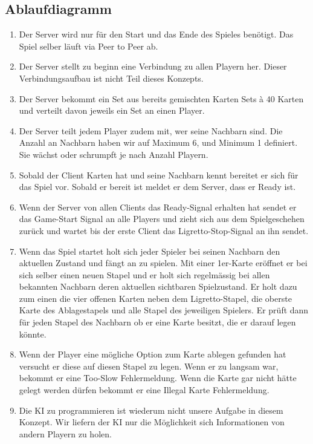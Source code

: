 \newpage

\subsection{Ablaufdiagramm}

\begin{enumerate}
	\item Der Server wird nur für den Start und das Ende des Spieles benötigt. Das Spiel selber läuft via Peer to Peer ab.
	\item Der Server stellt zu beginn eine Verbindung zu allen Playern her. Dieser Verbindungsaufbau ist nicht Teil dieses Konzepts.
	\item Der Server bekommt ein Set aus bereits gemischten Karten Sets à 40 Karten und verteilt davon jeweils ein Set an einen Player.
	\item Der Server teilt jedem Player zudem mit, wer seine Nachbarn sind. Die Anzahl an Nachbarn haben wir auf Maximum 6, und Minimum 1 definiert. Sie wächst oder schrumpft je nach Anzahl Playern.
	\item Sobald der Client Karten hat und seine Nachbarn kennt bereitet er sich für das Spiel vor. Sobald er bereit ist meldet er dem Server, dass er Ready ist.
	\item Wenn der Server von allen Clients das Ready-Signal erhalten hat sendet er das Game-Start Signal an alle Players und zieht sich aus dem Spielgeschehen zurück und wartet bis der erste Client das Ligretto-Stop-Signal an ihn sendet.
	\item Wenn das Spiel startet holt sich jeder Spieler bei seinen Nachbarn den aktuellen Zustand und fängt an zu spielen. Mit einer 1er-Karte eröffnet er bei sich selber einen neuen Stapel und er holt sich regelmässig bei allen bekannten Nachbarn deren aktuellen sichtbaren Spielzustand. Er holt dazu zum einen die vier offenen Karten neben dem Ligretto-Stapel, die oberste Karte des Ablagestapels und alle Stapel des jeweiligen Spielers. Er prüft dann für jeden Stapel des Nachbarn ob er eine Karte besitzt, die er darauf legen könnte.
	\item Wenn der Player eine mögliche Option zum Karte ablegen gefunden hat versucht er diese auf diesen Stapel zu legen. Wenn er zu langsam war, bekommt er eine Too-Slow Fehlermeldung. Wenn die Karte gar nicht hätte gelegt werden dürfen bekommt er eine Illegal Karte Fehlermeldung.
	\item Die KI zu programmieren ist wiederum nicht unsere Aufgabe in diesem Konzept. Wir liefern der KI nur die Möglichkeit sich Informationen von andern Playern zu holen.

\end{enumerate}
